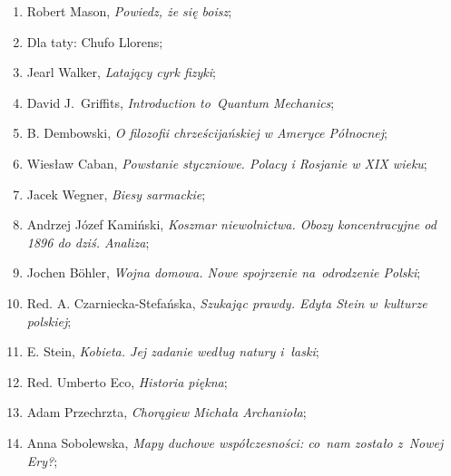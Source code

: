 \documentclass[a4paper,11pt]{article}
\begin{document}
\begin{enumerate}
\item Robert Mason, \textit{Powiedz, że się boisz};



\item Dla taty: Chufo Llorens;



\item Jearl Walker, \textit{Latający cyrk fizyki};



\item David J.~Griffits, \textit{Introduction to~Quantum Mechanics};



\item B. Dembowski, \textit{O filozofii chrześcijańskiej w Ameryce
    Północnej};



\item Wiesław Caban, \textit{Powstanie styczniowe. Polacy i Rosjanie w
    XIX wieku};



\item Jacek Wegner, \textit{Biesy sarmackie};



\item Andrzej Józef Kamiński, \textit{Koszmar niewolnictwa. Obozy
    koncentracyjne od 1896 do dziś. Analiza};



\item Jochen B\"{o}hler, \textit{Wojna domowa. Nowe spojrzenie
    na~odrodzenie Polski};



\item Red. A. Czarniecka-Stefańska, \textit{Szukając prawdy. Edyta Stein
    w~kulturze polskiej};



\item E. Stein, \textit{Kobieta. Jej zadanie według natury i~łaski};



\item Red. Umberto Eco, \textit{Historia piękna};



\item Adam Przechrzta, \textit{Chorągiew Michała Archanioła};



\item Anna Sobolewska, \textit{Mapy duchowe współczesności: co~nam
    zostało z~Nowej Ery?};




\end{enumerate}
\end{document}
